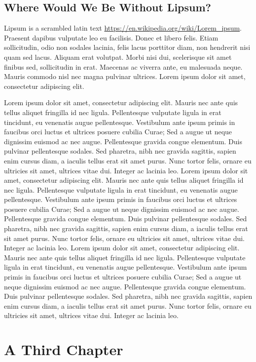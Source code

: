 \documentclass[sans,math-serif,solid,chem,code,notes]{bmc}
\begin{document}
\section{Where Would We Be Without Lipsum?}

Lipsum is a scrambled latin text \url{https://en.wikipedia.org/wiki/Lorem_ipsum}. Praesent dapibus vulputate leo eu facilisis. Donec et libero felis. Etiam sollicitudin, odio non sodales lacinia, felis lacus porttitor diam, non hendrerit nisi quam sed lacus. Aliquam erat volutpat. Morbi nisi dui, scelerisque sit amet finibus sed, sollicitudin in erat. Maecenas ac viverra ante, eu malesuada neque. Mauris commodo nisl nec magna pulvinar ultrices. Lorem ipsum dolor sit amet, consectetur adipiscing elit.


\newpage
Lorem ipsum dolor sit amet, consectetur adipiscing elit. Mauris nec ante quis tellus aliquet fringilla id nec ligula. Pellentesque vulputate ligula in erat tincidunt, eu venenatis augue pellentesque. Vestibulum ante ipsum primis in faucibus orci luctus et ultrices posuere cubilia Curae; Sed a augue ut neque dignissim euismod ac nec augue. Pellentesque gravida congue elementum. Duis pulvinar pellentesque sodales. Sed pharetra, nibh nec gravida sagittis, sapien enim cursus diam, a iaculis tellus erat sit amet purus. Nunc tortor felis, ornare eu ultricies sit amet, ultrices vitae dui. Integer ac lacinia leo.
\newpage
Lorem ipsum dolor sit amet, consectetur adipiscing elit. Mauris nec ante quis tellus aliquet fringilla id nec ligula. Pellentesque vulputate ligula in erat tincidunt, eu venenatis augue pellentesque. Vestibulum ante ipsum primis in faucibus orci luctus et ultrices posuere cubilia Curae; Sed a augue ut neque dignissim euismod ac nec augue. Pellentesque gravida congue elementum. Duis pulvinar pellentesque sodales. Sed pharetra, nibh nec gravida sagittis, sapien enim cursus diam, a iaculis tellus erat sit amet purus. Nunc tortor felis, ornare eu ultricies sit amet, ultrices vitae dui. Integer ac lacinia leo.
\newpage
Lorem ipsum dolor sit amet, consectetur adipiscing elit. Mauris nec ante quis tellus aliquet fringilla id nec ligula. Pellentesque vulputate ligula in erat tincidunt, eu venenatis augue pellentesque. Vestibulum ante ipsum primis in faucibus orci luctus et ultrices posuere cubilia Curae; Sed a augue ut neque dignissim euismod ac nec augue. Pellentesque gravida congue elementum. Duis pulvinar pellentesque sodales. Sed pharetra, nibh nec gravida sagittis, sapien enim cursus diam, a iaculis tellus erat sit amet purus. Nunc tortor felis, ornare eu ultricies sit amet, ultrices vitae dui. Integer ac lacinia leo.

\chapter{A Third Chapter}
\end{document}
